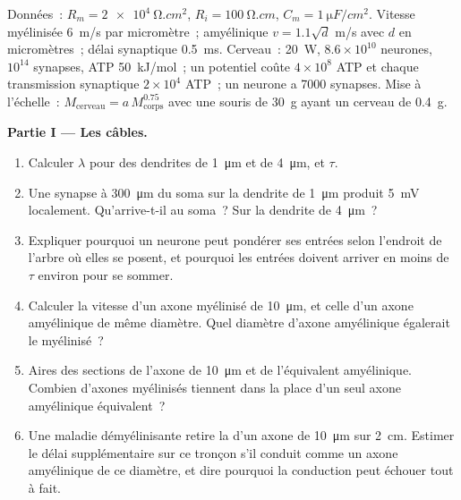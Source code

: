 \begin{problem}
\label{pb:b3:nervous-systems:1}
Données~: $R_{m} = \qty{2e4}{\ohm.cm^2}$, $R_{i} = \qty{100}{\ohm.cm}$,
$C_{m} = \qty{1}{\micro F/cm^2}$. Vitesse myélinisée \qty{6}{m/s} par
micromètre~; amyélinique $v = 1.1\sqrt{d}$ m/s avec $d$ en
micromètres~; délai synaptique \qty{0.5}{ms}. Cerveau~: \qty{20}{W},
$8.6\times 10^{10}$ neurones, $10^{14}$ synapses, ATP \qty{50}{kJ/mol}~;
un potentiel coûte $4\times 10^{8}$ ATP et chaque transmission
synaptique $2\times 10^{4}$ ATP~; un neurone a \num{7000} synapses. Mise
à l'échelle~: $M_{\text{cerveau}} = a\,M_{\text{corps}}^{0.75}$ avec une
souris de \qty{30}{g} ayant un cerveau de \qty{0.4}{g}.

\medskip
\noindent\textbf{Partie I --- Les câbles.}
\begin{enumerate}
  \item Calculer $\lambda$ pour des dendrites de \qty{1}{\micro m} et de
        \qty{4}{\micro m}, et $\tau$.
  \item Une synapse à \qty{300}{\micro m} du soma sur la dendrite de
        \qty{1}{\micro m} produit \qty{5}{mV} localement. Qu'arrive-t-il
        au soma~? Sur la dendrite de \qty{4}{\micro m}~?
  \item Expliquer pourquoi un neurone peut pondérer ses entrées selon
        l'endroit de l'arbre où elles se posent, et pourquoi les entrées
        doivent arriver en moins de $\tau$ environ pour se sommer.
  \item Calculer la vitesse d'un axone myélinisé de \qty{10}{\micro m},
        et celle d'un axone amyélinique de même diamètre. Quel diamètre
        d'axone amyélinique égalerait le myélinisé~?
  \item Aires des sections de l'axone de \qty{10}{\micro m} et de
        l'équivalent amyélinique. Combien d'axones myélinisés tiennent
        dans la place d'un seul axone amyélinique équivalent~?
  \item Une maladie démyélinisante retire la  d'un axone de
        \qty{10}{\micro m} sur \qty{2}{cm}. Estimer le délai
        supplémentaire sur ce tronçon s'il conduit comme un axone
        amyélinique de ce diamètre, et dire pourquoi la conduction peut
        échouer tout à fait.
\end{enumerate}


\end{problem}
